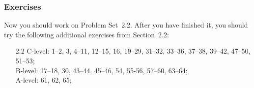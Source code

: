 \documentclass[serif,ignorenonframetext]{beamer}
\begin{document}
\begin{frame}
  \frametitle{Exercises}
  Now you should work on Problem Set~2.2.  After you have finished it,
  you should try the following additional exercises from Section~2.2:
  \begin{itemize}
  \item[2.2] 
    C-level: 1--2, 3, 4--11, 12--15, 16, 19--29, 31--32, 33--36, 37--38,
    39--42, 47--50, 51--53; \\
    B-level: 17--18, 30, 43--44, 45--46, 54, 55-56, 57--60, 63--64; \\
    A-level: 61, 62, 65;
  \end{itemize}
\end{frame}
\end{document}
